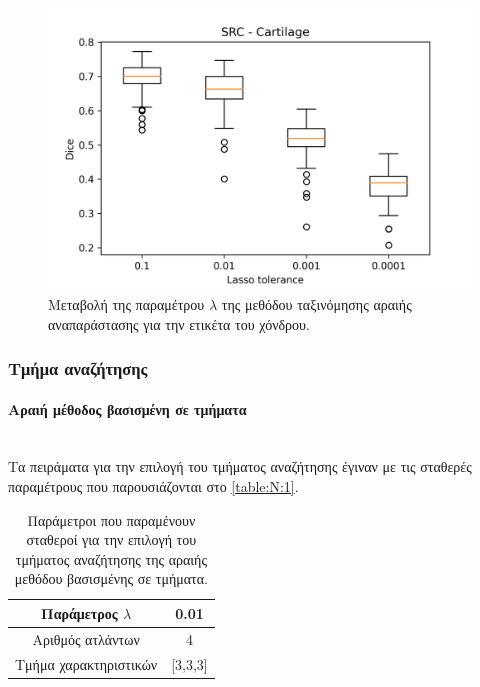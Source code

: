 \documentclass[a4paper,12pt]{article}
\newcommand{\paragraphLine}[1]{\paragraph{#1}\mbox{}\\}
\begin{document}
\begin{figure}[H]
    \centering
    \includegraphics[width=0.85\linewidth]{SRC_Lasso_tolerance_Cartilage_plot.png}
    \caption{Μεταβολή της παραμέτρου $\lambda$ της μεθόδου ταξινόμησης αραιής
             αναπαράστασης για την ετικέτα του χόνδρου.}
    \label{fig:SRC:lambda:3}
\end{figure}


\subsubsection{Τμήμα αναζήτησης}

\paragraphLine{Αραιή μέθοδος βασισμένη σε τμήματα}

Τα πειράματα για την επιλογή του τμήματος αναζήτησης έγιναν με τις σταθερές
παραμέτρους που παρουσιάζονται στο \autoref{table:N:1}.

\begin{table}[h!]
    \centering
    \begin{tabular}{|c|c|} 
        \hline
        Παράμετρος $\lambda$ & 0.01 \\ 
        \hline
        Αριθμός ατλάντων & 4 \\ 
        \hline
        Τμήμα χαρακτηριστικών & [3,3,3] \\ 
        \hline
    \end{tabular}
    \caption{Παράμετροι που παραμένουν σταθεροί για την επιλογή του τμήματος
             αναζήτησης της αραιής μεθόδου βασισμένης σε τμήματα.}
    \label{table:N:1}
\end{table}
\end{document}
